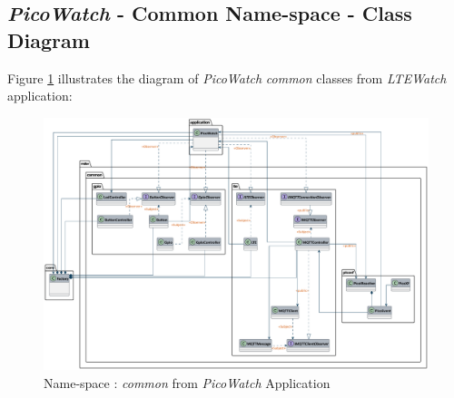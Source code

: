 \documentclass[report.tex]{subfiles}
\begin{document}
\begin{landscape}
\subsection{\textit{PicoWatch} - Common Name-space - Class Diagram}

Figure \ref{fig:picoWatchCommon} illustrates the diagram of \textit{PicoWatch} \textit{common} classes from \textit{LTEWatch} application: 

\begin{figure}[H]
	\centering
	\includegraphics[width=1.2\textwidth]{Include/Figure/software/class/picoWatchCommon.pdf}
	\caption{Name-space : \textit{common} from \textit{PicoWatch} Application}
	\label{fig:picoWatchCommon}
\end{figure}
\end{landscape}
\end{document}
